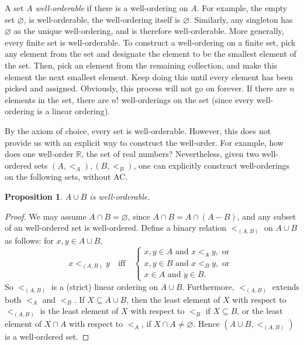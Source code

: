 \documentclass[12pt]{article}
\newtheorem{prop}{Proposition}
\begin{document}
A set $A$ \emph{well-orderable} if there is a well-ordering on $A$.  For example, the empty set $\varnothing$, is well-orderable, the well-ordering itself is $\varnothing$.  Similarly, any singleton has $\varnothing$ as the unique well-ordering, and is therefore well-orderable.  More generally, every finite set is well-orderable.  To construct a well-ordering on a finite set, pick any element from the set and designate the element to be the smallest element of the set.  Then, pick an element from the remaining collection, and make this element the next smallest element.  Keep doing this until every element has been picked and assigned.  Obviously, this process will not go on forever.  If there are $n$ elements in the set, there are $n!$ well-orderings on the set (since every well-ordering is a linear ordering).  

By the axiom of choice, every set is well-orderable.  However, this does not provide us with an explicit way to construct the well-order.  For example, how does one well-order $\mathbb{R}$, the set of real numbers?  Nevertheless, given two well-ordered sets $(A,<_A),(B,<_B)$, one can explicitly construct well-orderings on the following sets, without AC.

\begin{prop} $A\cup B$ is well-orderable. \end{prop}
\begin{proof}  We may assume $A\cap B=\varnothing$, since $A\cap B=A \cap (A-B)$, and any subset of an well-ordered set is well-ordered.  Define a binary relation $<_{(A,B)}$ on $A\cup B$ as follows: for $x,y\in A\cup B$,
\begin{displaymath}
x<_{(A,B)} y \quad \mbox{iff} \quad \left\{
\begin{array}{ll}
x,y \in A \mbox{ and } x<_A y, \mbox{ or }\\
x,y \in B \mbox{ and } x<_B y, \mbox{ or }\\
x \in A \mbox{ and } y\in B.
\end{array}
\right.
\end{displaymath}
So $<_{(A,B)}$ is a (strict) linear ordering on $A\cup B$.  Furthermore, $<_{(A,B)}$ extends both $<_A$ and $<_B$.  If $X\subseteq A\cup B$, then the least element of $X$ with respect to $<_{(A,B)}$ is the least element of $X$ with respect to $<_B$ if $X\subseteq B$, or the least element of $X\cap A$ with respect to $<_A$, if $X\cap A\ne \varnothing$.  Hence $(A\cup B, <_{(A,B)})$ is a well-ordered set.
\end{proof}
\end{document}
